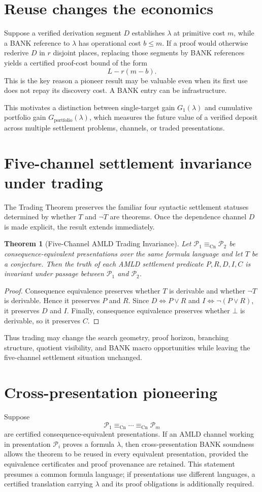 \documentclass[11pt]{article}
\newtheorem{theorem}[definition]{Theorem}
\theoremstyle{remark}
\newcommand{\CnEq}{\equiv_{\mathrm{Cn}}}
\begin{document}
\section{Reuse changes the economics}
Suppose a verified derivation segment $D$ establishes $\lambda$ at primitive cost $m$, while a BANK reference to $\lambda$ has operational cost $b\le m$. If a proof would otherwise rederive $D$ in $r$ disjoint places, replacing those segments by BANK references yields a certified proof-cost bound of the form
\[
L-r(m-b).
\]
This is the key reason a pioneer result may be valuable even when its first use does not repay its discovery cost. A BANK entry can be infrastructure.

This motivates a distinction between single-target gain $G_1(\lambda)$ and cumulative portfolio gain $G_{\mathrm{portfolio}}(\lambda)$, which measures the future value of a verified deposit across multiple settlement problems, channels, or traded presentations.

\section{Five-channel settlement invariance under trading}
The Trading Theorem preserves the familiar four syntactic settlement statuses determined by whether $T$ and $\neg T$ are theorems. Once the dependence channel $D$ is made explicit, the result extends immediately.

\begin{theorem}[Five-Channel AMLD Trading Invariance]
Let $\mathcal P_1\CnEq\mathcal P_2$ be consequence-equivalent presentations over the same formula language and let $T$ be a conjecture. Then the truth of each AMLD settlement predicate $P,R,D,I,C$ is invariant under passage between $\mathcal P_1$ and $\mathcal P_2$.
\end{theorem}
\begin{proof}
Consequence equivalence preserves whether $T$ is derivable and whether $\neg T$ is derivable. Hence it preserves $P$ and $R$. Since $D\Longleftrightarrow P\lor R$ and $I\Longleftrightarrow\neg(P\lor R)$, it preserves $D$ and $I$. Finally, consequence equivalence preserves whether $\bot$ is derivable, so it preserves $C$.
\end{proof}
Thus trading may change the search geometry, proof horizon, branching structure, quotient visibility, and BANK macro opportunities while leaving the five-channel settlement situation unchanged.

\section{Cross-presentation pioneering}
Suppose
\[
\mathcal P_1\CnEq\cdots\CnEq\mathcal P_m
\]
are certified consequence-equivalent presentations. If an AMLD channel working in presentation $\mathcal P_i$ proves a formula $\lambda$, then cross-presentation BANK soundness allows the theorem to be reused in every equivalent presentation, provided the equivalence certificates and proof provenance are retained. This statement presumes a common formula language; if presentations use different languages, a certified translation carrying $\lambda$ and its proof obligations is additionally required.
\end{document}
